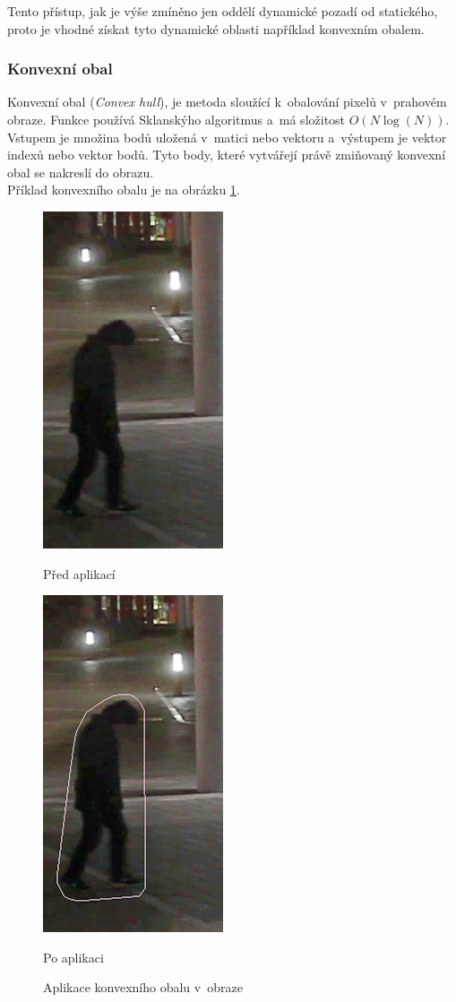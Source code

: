 Tento přístup, jak je výše zmíněno jen oddělí dynamické pozadí od statického, proto je vhodné získat tyto dynamické oblasti například konvexním obalem.

\subsubsection*{Konvexní obal}
Konvexní obal (\textit{Convex hull}), je metoda sloužící k~obalování pixelů v~prahovém obraze. Funkce používá Sklanskýho algoritmus \cite{openCV:sklansky} a~má složitost  $O(N \log(N))$.  Vstupem je množina bodů uložená v~matici nebo vektoru a~výstupem je vektor indexů nebo vektor bodů. Tyto body, které vytvářejí právě zmiňovaný konvexní obal se nakreslí do obrazu. \\
Příklad konvexního obalu je na obrázku \ref{fig:convexHull}.
\begin{figure}[H]
\centering
\begin{minipage}{.5\textwidth}
  \centering
  \includegraphics[width=.3\linewidth]{figures/Hull_Original}
  \caption*{Před aplikací}
  \label{fig:original}
\end{minipage}%
\begin{minipage}{.5\textwidth}
  \centering
  \includegraphics[width=.3\linewidth]{figures/Hull_Result}
  \caption*{Po aplikaci}
  \label{fig:result}
\end{minipage}
\caption{Aplikace konvexního obalu v~obraze}
\label{fig:convexHull}
\end{figure} 

